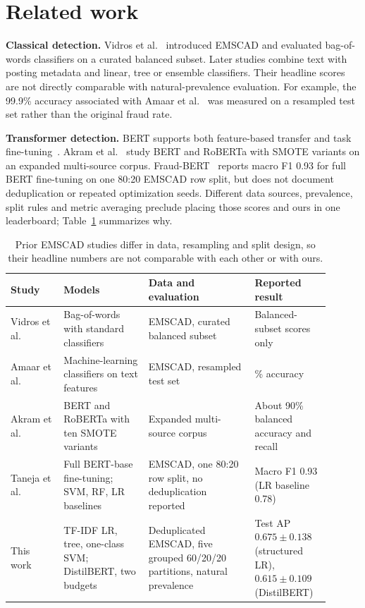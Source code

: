 \section{Related work}
\label{related}

\textbf{Classical detection.} Vidros et al.~\cite{vidros2017} introduced EMSCAD and evaluated
bag-of-words classifiers on a curated balanced subset. Later studies combine text with posting
metadata and linear, tree or ensemble classifiers. Their headline scores are not directly comparable
with natural-prevalence evaluation. For example, the 99.9\% accuracy associated with Amaar et
al.~\cite{amaar2022} was measured on a resampled test set rather than the original fraud rate.

\textbf{Transformer detection.} BERT supports both feature-based transfer and task
fine-tuning~\cite{devlin2019}. Akram et al.~\cite{akram2024} study BERT and RoBERTa with SMOTE
variants on an expanded multi-source corpus. Fraud-BERT~\cite{taneja2025} reports macro F1 0.93 for
full BERT fine-tuning on one 80:20 EMSCAD row split, but does not document deduplication or repeated
optimization seeds. Different data sources, prevalence, split rules and metric averaging preclude
placing those scores and ours in one leaderboard; Table~\ref{tab:related} summarizes why.

\begin{table}[tb]
\centering
\small
\begin{tabular}{>{\raggedright\arraybackslash}p{0.15\linewidth}>{\raggedright\arraybackslash}p{0.24\linewidth}>{\raggedright\arraybackslash}p{0.30\linewidth}>{\raggedright\arraybackslash}p{0.21\linewidth}}
\toprule
\textbf{Study} & \textbf{Models} & \textbf{Data and evaluation} & \textbf{Reported result} \\
\midrule
Vidros et al.~\cite{vidros2017} & Bag-of-words with standard classifiers & EMSCAD, curated balanced subset & Balanced-subset scores only \\
Amaar et al.~\cite{amaar2022} & Machine-learning classifiers on text features & EMSCAD, resampled test set & 99.9\% accuracy \\
Akram et al.~\cite{akram2024} & BERT and RoBERTa with ten SMOTE variants & Expanded multi-source corpus & About 90\% balanced accuracy and recall \\
Taneja et al.~\cite{taneja2025} & Full BERT-base fine-tuning; SVM, RF, LR baselines & EMSCAD, one 80:20 row split, no deduplication reported & Macro F1 0.93 (LR baseline 0.78) \\
This work & TF-IDF LR, tree, one-class SVM; DistilBERT, two budgets & Deduplicated EMSCAD, five grouped 60/20/20 partitions, natural prevalence & Test AP $0.675\pm0.138$ (structured LR), $0.615\pm0.109$ (DistilBERT) \\
\bottomrule
\end{tabular}
\caption{Prior EMSCAD studies differ in data, resampling and split design, so their headline numbers
are not comparable with each other or with ours.}
\label{tab:related}
\end{table}

